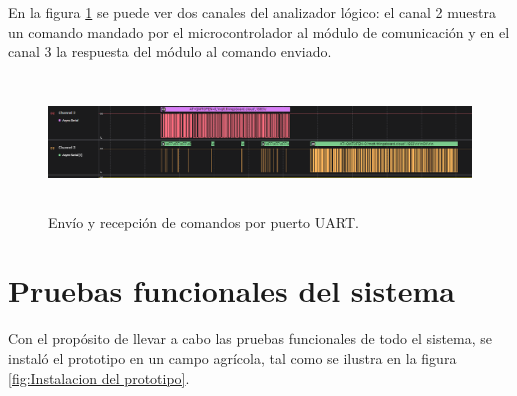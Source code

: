 En la figura \ref{fig:trama uart1} se puede ver dos canales del analizador  lógico: el canal 2 muestra un comando mandado por el microcontrolador al módulo de comunicación y en el canal 3 la respuesta del módulo al comando enviado.

\begin{figure}[h!]
  \centering
    \includegraphics[width=\linewidth, height=3.5cm]{./Figures/trama_uart1.png}
  \caption{Envío y recepción de comandos por puerto UART.}
    \label{fig:trama uart1}
\end{figure}

\section{Pruebas funcionales del sistema}
Con el propósito de llevar a cabo las pruebas funcionales de todo el sistema, se instaló el prototipo en un campo agrícola, tal como se ilustra en la figura \ref{fig:Instalacion del prototipo}.

